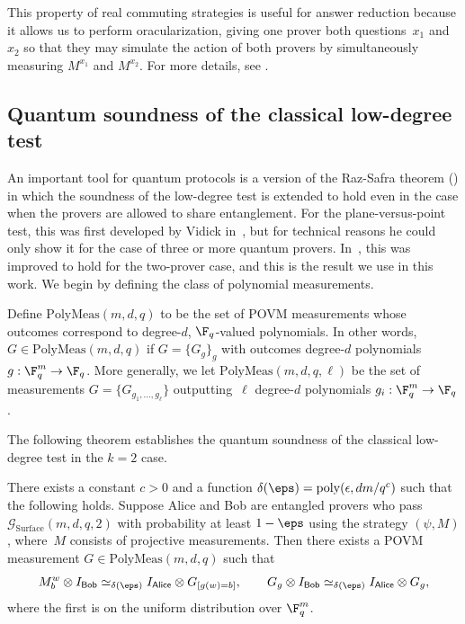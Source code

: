\documentclass[11pt]{article}
\newcommand{\consistency}{\simeq}
\newcommand{\polymeas}[3]{\mathrm{PolyMeas}(#1,#2,#3)}
\newcommand{\simulpolymeas}[4]{\mathrm{PolyMeas}(#1,#2,#3, #4)}
\newcommand{\game}{\mathscr{G}}
\newcommand{\reg}[1]{{\mathsf{#1}}}
\begin{document}
This property of real commuting strategies is useful for answer
reduction because it allows us to perform oracularization, giving one
prover both questions~$x_1$ and~$x_2$ so that they may simulate the
action of both provers by simultaneously measuring $M^{x_1}$ and $M^{x_2}$.
For more details, see .

\subsection{Quantum soundness of the classical low-degree test}\label{sec:classical-q-low-deg}

An important tool for quantum protocols
is a version of the Raz-Safra theorem ()
in which the soundness of the low-degree test is extended to hold even in the case when the provers are allowed to share entanglement.
For the plane-versus-point test, this was first developed by Vidick in~\cite{Vid16}, but for technical reasons he could only show it for the case of three or more quantum provers.
In~\cite{NV18b}, this was improved to hold for the two-prover case, and this is the result we use in this work.
We begin by defining the class of polynomial measurements.

\begin{definition}
Define $\mathrm{PolyMeas}(m, d, q)$ to be the set of POVM measurements whose outcomes correspond to degree-$d$, $\F_q$-valued polynomials.
In other words, $G \in \polymeas{m}{d}{q}$ if $G = \{G_g\}_g$ with outcomes degree-$d$ polynomials $g:\F_q^m \rightarrow \F_q$.
More generally, we let $\simulpolymeas{m}{d}{q}{\ell}$ be the set of measurements $G = \{G_{g_1, \ldots, g_\ell}\}$ outputting~$\ell$ degree-$d$ polynomials $g_i:\F_q^m \rightarrow \F_q$.
\end{definition}

The following theorem establishes the quantum soundness of the classical low-degree test in the $k = 2$ case.

\begin{theorem}\label{thm:anand-thomas-classical-low-degree}
There exists a constant $c > 0$ and a function $\delta(\eps) = \mathrm{poly}(\epsilon, dm/q^c)$ such that the following holds.
Suppose Alice and Bob are entangled provers who pass $\game_{\mathrm{Surface}}(m,d,q,2)$ with probability at least $1-\eps$
using the strategy $(\psi, M)$, where~$M$ consists of projective measurements.
Then there exists a POVM measurement $G \in \polymeas{m}{d}{q}$ such that
\begin{equation*}
M^w_b \otimes I_{\reg{Bob}} \consistency_{\delta(\eps)} I_{\reg{Alice}} \otimes G_{[g(w)=b]},
\qquad
G_g \otimes I_{\reg{Bob}} \consistency_{\delta(\eps)} I_{\reg{Alice}} \otimes G_g,
\end{equation*}
where the first is on the uniform distribution over $\F_q^m$.
\end{theorem}
\end{document}
